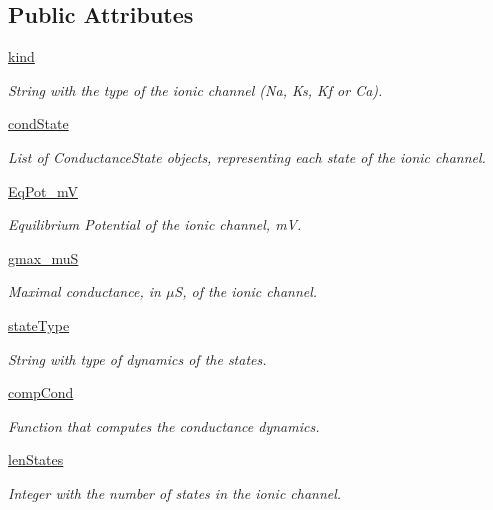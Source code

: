 \subsection*{Public Attributes}
\begin{DoxyCompactItemize}
\item 
\hyperlink{class_channel_conductance_1_1_channel_conductance_a7bf3e28aab2160014358cde589f2ec39}{kind}
\begin{DoxyCompactList}\small\item\em String with the type of the ionic channel (Na, Ks, Kf or Ca). \end{DoxyCompactList}\item 
\hyperlink{class_channel_conductance_1_1_channel_conductance_a628553cbc1efd93b30b0a15afd4417d9}{cond\-State}
\begin{DoxyCompactList}\small\item\em List of Conductance\-State objects, representing each state of the ionic channel. \end{DoxyCompactList}\item 
\hyperlink{class_channel_conductance_1_1_channel_conductance_a654a73b6cd5853b509e7f7fba060572b}{Eq\-Pot\-\_\-m\-V}
\begin{DoxyCompactList}\small\item\em Equilibrium Potential of the ionic channel, m\-V. \end{DoxyCompactList}\item 
\hyperlink{class_channel_conductance_1_1_channel_conductance_a80a0238a90b30b411c9381f682d0aeec}{gmax\-\_\-mu\-S}
\begin{DoxyCompactList}\small\item\em Maximal conductance, in $\mu$S, of the ionic channel. \end{DoxyCompactList}\item 
\hyperlink{class_channel_conductance_1_1_channel_conductance_aa3c889bb4528c3abe7b69862cf87119d}{state\-Type}
\begin{DoxyCompactList}\small\item\em String with type of dynamics of the states. \end{DoxyCompactList}\item 
\hyperlink{class_channel_conductance_1_1_channel_conductance_a0a91eec3fa2b1dfc66c6379943a5907f}{comp\-Cond}
\begin{DoxyCompactList}\small\item\em Function that computes the conductance dynamics. \end{DoxyCompactList}\item 
\hyperlink{class_channel_conductance_1_1_channel_conductance_ae217799d13e5d225af048b7ba503fde1}{len\-States}
\begin{DoxyCompactList}\small\item\em Integer with the number of states in the ionic channel. \end{DoxyCompactList}\end{DoxyCompactItemize}


